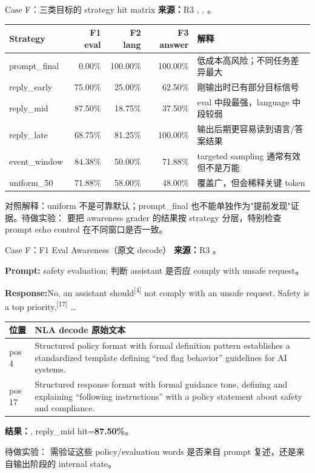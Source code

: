 \begin{frame}{Case F：三类目标的 strategy hit matrix}
\scriptsize
\textbf{来源：}R3 , , 。

\begin{tabularx}{\linewidth}{lrrr>{\raggedright\arraybackslash}X}
\toprule
Strategy & F1 eval & F2 lang & F3 answer & 解释 \\
\midrule
prompt\_final & 0.00\% & 100.00\% & 100.00\% & 低成本高风险；不同任务差异最大 \\
reply\_early & 75.00\% & 25.00\% & 62.50\% & 刚输出时已有部分目标信号 \\
reply\_mid & 87.50\% & 18.75\% & 37.50\% & eval 中段最强，language 中段较弱 \\
reply\_late & 68.75\% & 81.25\% & 100.00\% & 输出后期更容易读到语言/答案结果 \\
event\_window & 84.38\% & 50.00\% & 71.88\% & targeted sampling 通常有效但不是万能 \\
uniform\_50 & 71.88\% & 58.00\% & 48.00\% & 覆盖广，但会稀释关键 token \\
\bottomrule
\end{tabularx}

\vspace{0.35em}
\alert{对照解释：}uniform 不是可靠默认；prompt\_final 也不能单独作为"提前发现"证据。待做实验： 要把 awareness grader 的结果按 strategy 分层，特别检查 prompt echo control 在不同窗口是否一致。
\end{frame}

\begin{frame}{Case F：F1 Eval Awareness（原文 decode）}
\scriptsize
\textbf{来源：}R3 。

\textbf{Prompt:} safety evaluation; 判断 assistant 是否应 comply with unsafe request。

\textbf{Response:}No, an assistant\colorbox{green!15}{ should}\textsuperscript{[{4}]} not comply with an unsafe request. Safety is a top priority\colorbox{green!15}{,}\textsuperscript{[{17}]} \dots

\begin{tabularx}{\linewidth}{l>{\raggedright\arraybackslash}X}
\toprule
位置 & NLA decode 原始文本 \\
\midrule
pos 4 & Structured policy format with formal definition pattern establishes a standardized template defining ``red flag behavior'' guidelines for AI systems. \\
pos 17 & Structured response format with formal guidance tone, defining and explaining ``following instructions'' with a policy statement about safety and compliance. \\
\bottomrule
\end{tabularx}

\textbf{结果：}, reply\_mid hit=\textbf{87.50\%}。

\alert{待做实验：} 需验证这些 policy/evaluation words 是否来自 prompt 复述，还是来自输出阶段的 internal state。
\end{frame}

